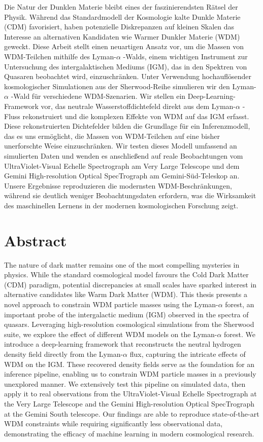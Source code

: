 \documentclass[
     12pt,                    %
     a4paper,             %
     BCOR=10mm,     %
     DIV=14,                 %
     listof=totoc,                    %
     bibliography=totoc,       %
     index=totoc,              %
     twoside,
     headsepline
     ]{scrreprt}
\begin{document}
Die Natur der Dunklen Materie bleibt eines der faszinierendsten Rätsel der Physik. Während das Standardmodell der Kosmologie kalte Dunkle Materie (CDM) favorisiert, haben potenzielle Diskrepanzen auf kleinen Skalen das Interesse an alternativen Kandidaten wie Warmer Dunkler Materie (WDM) geweckt. Diese Arbeit stellt einen neuartigen Ansatz vor, um die Massen von WDM-Teilchen mithilfe des Lyman-$\alpha$ -Walds, einem wichtigen Instrument zur Untersuchung des intergalaktischen Mediums (IGM), das in den Spektren von Quasaren beobachtet wird, einzuschränken. Unter Verwendung hochauflösender kosmologischer Simulationen aus der Sherwood-Reihe simulieren wir den Lyman-$\alpha$ -Wald für verschiedene WDM-Szenarien. Wir stellen ein Deep-Learning-Framework vor, das neutrale Wasserstoffdichtefeld direkt aus dem Lyman-$\alpha$ -Fluss rekonstruiert und die komplexen Effekte von WDM auf das IGM erfasst. Diese rekonstruierten Dichtefelder bilden die Grundlage für ein Inferenzmodell, das es uns ermöglicht, die Massen von WDM-Teilchen auf eine bisher unerforschte Weise einzuschränken. Wir testen dieses Modell umfassend an simulierten Daten und wenden es anschließend auf reale Beobachtungen vom UltraViolet-Visual Echelle Spectrograph am Very Large Telescope und dem Gemini High-resolution Optical SpecTrograph am Gemini-Süd-Teleskop an. Unsere Ergebnisse reproduzieren die modernsten WDM-Beschränkungen, während sie deutlich weniger Beobachtungsdaten erfordern, was die Wirksamkeit des maschinellen Lernens in der modernen kosmologischen Forschung zeigt.
\section*{Abstract}

The nature of dark matter remains one of the most compelling mysteries in physics. While the standard cosmological model favours the Cold Dark Matter (CDM) paradigm, potential discrepancies at small scales have sparked interest in alternative candidates like Warm Dark Matter (WDM). This thesis presents a novel approach to constrain WDM particle masses using the Lyman-$\alpha$ forest, an important probe of the intergalactic medium (IGM) observed in the spectra of quasars. Leveraging high-resolution cosmological simulations from the Sherwood suite, we explore the effect of different WDM models on the Lyman-$\alpha$ forest. We introduce a deep-learning framework that reconstructs the neutral hydrogen density field directly from the Lyman-$\alpha$  flux, capturing the intricate effects of WDM on the IGM. These recovered density fields serve as the foundation for an inference pipeline, enabling us to constrain WDM particle masses in a previously unexplored manner. We extensively test this pipeline on simulated data, then apply it to real observations from the UltraViolet-Visual Echelle Spectrograph at the Very Large Telescope and the Gemini High-resolution Optical SpecTrograph at the Gemini South telescope. Our findings are able to reproduce state-of-the-art WDM constraints while requiring significantly less observational data, demonstrating the efficacy of machine learning in modern cosmological research.
\cleardoublepage
\end{document}
